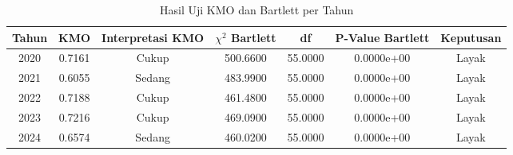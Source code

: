 \begin{table}[H]
\centering
\caption{Hasil Uji KMO dan Bartlett per Tahun} \label{tab:kmo_bartlett}
\begin{adjustbox}{max width=\textwidth, max height=0.85\textheight}
\begin{tabular}{|c|c|c|c|c|c|c|}
\hline
\textbf{Tahun} & \textbf{KMO} & \textbf{Interpretasi KMO} & \textbf{$\chi^2$ Bartlett} & \textbf{df} & \textbf{P-Value Bartlett} & \textbf{Keputusan} \\
\hline
2020 & 0.7161 & Cukup & 500.6600 & 55.0000 & 0.0000e+00 & Layak \\
2021 & 0.6055 & Sedang & 483.9900 & 55.0000 & 0.0000e+00 & Layak \\
2022 & 0.7188 & Cukup & 461.4800 & 55.0000 & 0.0000e+00 & Layak \\
2023 & 0.7216 & Cukup & 469.0900 & 55.0000 & 0.0000e+00 & Layak \\
2024 & 0.6574 & Sedang & 460.0200 & 55.0000 & 0.0000e+00 & Layak \\
\hline
\end{tabular}
\end{adjustbox}
\end{table}
